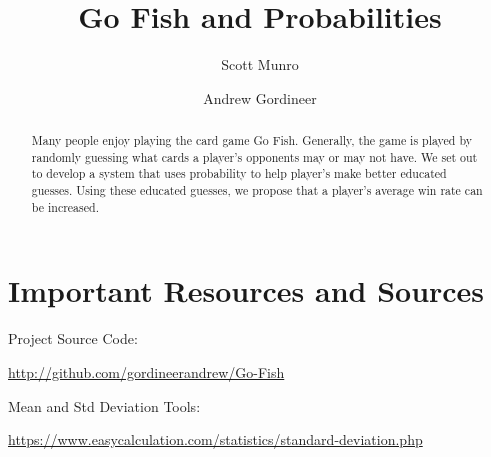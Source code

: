 \documentclass[preprint,12pt]{elsarticle}
\begin{document}
\begin{frontmatter}


\title{Go Fish and Probabilities}




\author{Scott Munro}
\author{Andrew Gordineer}

\address{Austin, TX, United States}

\begin{abstract}
Many people enjoy playing the card game Go Fish. Generally, the game is played by randomly guessing what cards a player’s opponents may or may not have. We set out to develop a system that uses probability to help player’s make better educated guesses. Using these educated guesses, we propose that a player's average win rate can be increased. 
\end{abstract}

\end{frontmatter}

\linenumbers

\section{Important Resources and Sources}
\label{P:1}
\noindent Project Source Code: 

\noindent \url{http://github.com/gordineerandrew/Go-Fish}

\noindent Mean and Std Deviation Tools: 

\noindent \url{https://www.easycalculation.com/statistics/standard-deviation.php}
\end{document}
